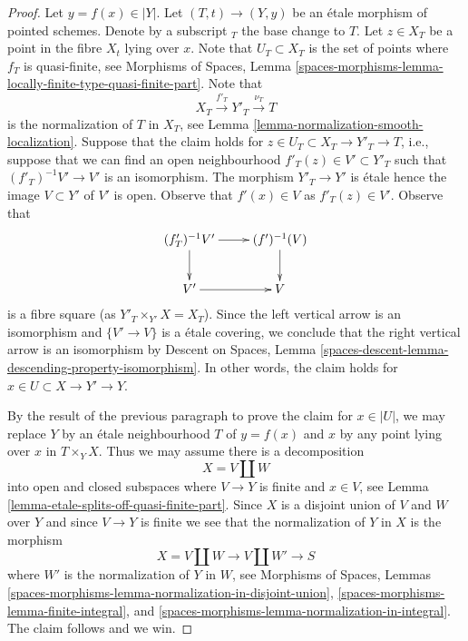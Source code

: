 \documentclass[10pt,a4paper]{amsart}
\theoremstyle{plain}
\theoremstyle{definition}
\theoremstyle{remark}
\numberwithin{equation}{subsection}
\begin{document}
\begin{proof}
\medskip\noindent
Let $y = f(x) \in |Y|$. Let $(T, t) \to (Y, y)$ be an \'etale morphism
of pointed schemes. Denote by a subscript ${}_T$ the base change to $T$.
Let $z \in X_T$ be a point in the fibre $X_t$ lying over $x$.
Note that $U_T \subset X_T$ is the set of points where $f_T$ is
quasi-finite, see Morphisms of Spaces, Lemma
\ref{spaces-morphisms-lemma-locally-finite-type-quasi-finite-part}.
Note that
$$
X_T \xrightarrow{f'_T} Y'_T \xrightarrow{\nu_T} T
$$
is the normalization of $T$ in $X_T$, see
Lemma \ref{lemma-normalization-smooth-localization}.
Suppose that the claim holds for $z \in U_T \subset X_T \to Y'_T \to T$, i.e.,
suppose that we can find an open neighbourhood
$f'_T(z) \in V' \subset Y'_T$ such that $(f'_T)^{-1}V' \to V'$ is an
isomorphism. The morphism $Y'_T \to Y'$ is \'etale hence the image
$V \subset Y'$ of $V'$ is open. Observe that $f'(x) \in V$ as $f'_T(z) \in V'$.
Observe that
$$
\xymatrix{
(f'_T)^{-1}V' \ar[r] \ar[d] & (f')^{-1}(V) \ar[d] \\
V' \ar[r] & V
}
$$
is a fibre square (as $Y'_T \times_{Y'} X = X_T$).
Since the left vertical arrow is an isomorphism
and $\{V' \to V\}$ is a \'etale covering, we conclude that the right vertical
arrow is an isomorphism by
Descent on Spaces, Lemma
\ref{spaces-descent-lemma-descending-property-isomorphism}.
In other words, the claim holds for $x \in U \subset X \to Y' \to Y$.

\medskip\noindent
By the result of the previous paragraph to prove the claim for
$x \in |U|$, we may replace $Y$ by an \'etale neighbourhood $T$ of
$y = f(x)$ and $x$ by any point lying over $x$ in $T \times_Y X$.
Thus we may assume there is a decomposition
$$
X = V \amalg W
$$
into open and closed subspaces where $V \to Y$ is finite and $x \in V$,
see Lemma \ref{lemma-etale-splits-off-quasi-finite-part}.
Since $X$ is a disjoint union of $V$ and $W$ over $Y$ and since
$V \to Y$ is finite we see that the
normalization of $Y$ in $X$ is the morphism
$$
X = V \amalg W \longrightarrow V \amalg W' \longrightarrow S
$$
where $W'$ is the normalization of $Y$ in $W$, see
Morphisms of Spaces, Lemmas
\ref{spaces-morphisms-lemma-normalization-in-disjoint-union},
\ref{spaces-morphisms-lemma-finite-integral}, and
\ref{spaces-morphisms-lemma-normalization-in-integral}.
The claim follows and we win.
\end{proof}
\end{document}
